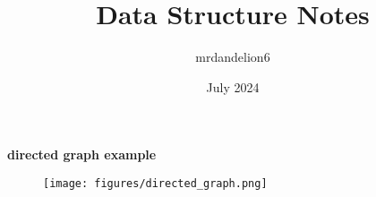 \documentclass{article}
\title{Data Structure Notes}
\author{mrdandelion6}
\date{July 2024}
\newenvironment{mypar}{%
    \setlength{\parskip}{1em}%
    \parindent=0pt%
}{%
    \par%
}
\begin{document}
\begin{mypar}
\textbf{directed graph example}

\begin{figure}[h]
\centering
\texttt{[image: figures/directed\_graph.png]}
\end{figure}
\end{mypar}
\end{document}
